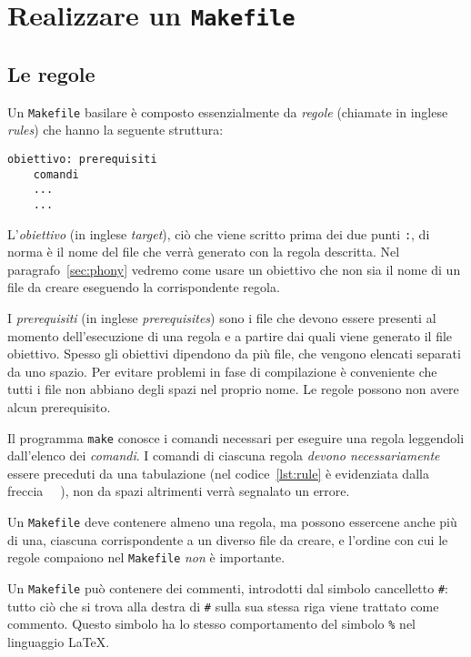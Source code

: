 \cleardoublepage
\chapter{Realizzare un \texttt{Makefile}}
\label{cha:realizzare-makefile}

\section{Le regole}
\label{sec:le-regole}

Un \texttt{Makefile} basilare è composto essenzialmente da \emph{regole}
(chiamate in inglese \emph{rules}) che hanno la seguente struttura:
\begin{lstlisting}[showtabs=true,tab=\rightarrowfill,caption={Struttura di una
regola.},label=lst:rule]
obiettivo: prerequisiti
	comandi
	...
	...
\end{lstlisting}
L'\emph{obiettivo} (in inglese \emph{target}), ciò che viene scritto prima dei
due punti \texttt{:}, di norma è il nome del file che verrà generato con la
regola descritta.  Nel paragrafo~\ref{sec:phony} vedremo come usare un obiettivo
che non sia il nome di un file da creare eseguendo la corrispondente regola.

I \emph{prerequisiti} (in inglese \emph{prerequisites}) sono i file che devono
essere presenti al momento dell'esecuzione di una regola e a partire dai quali
viene generato il file obiettivo.  Spesso gli obiettivi dipendono da più file,
che vengono elencati separati da uno spazio.  Per evitare problemi in fase di
compilazione è conveniente che tutti i file non abbiano degli spazi nel proprio
nome.  Le regole possono non avere alcun prerequisito.

Il programma \texttt{make} conosce i comandi necessari per eseguire una regola
leggendoli dall'elenco dei \emph{comandi}.  I comandi di ciascuna regola
\emph{devono necessariamente} essere preceduti da una tabulazione (nel
codice~\ref{lst:rule} è evidenziata dalla freccia
\lstinline[showtabs=true,tab=\rightarrowfill]{	}), non da spazi altrimenti
verrà segnalato un errore.

Un \texttt{Makefile} deve contenere almeno una regola, ma possono essercene
anche più di una, ciascuna corrispondente a un diverso file da creare, e
l'ordine con cui le regole compaiono nel \texttt{Makefile} \emph{non} è
importante.

Un \texttt{Makefile} può contenere dei commenti, introdotti dal simbolo
cancelletto \texttt{\#}: tutto ciò che si trova alla destra di \texttt{\#} sulla
sua stessa riga viene trattato come commento.  Questo simbolo ha lo stesso
comportamento del simbolo \texttt{\%} nel linguaggio \LaTeX{}.

